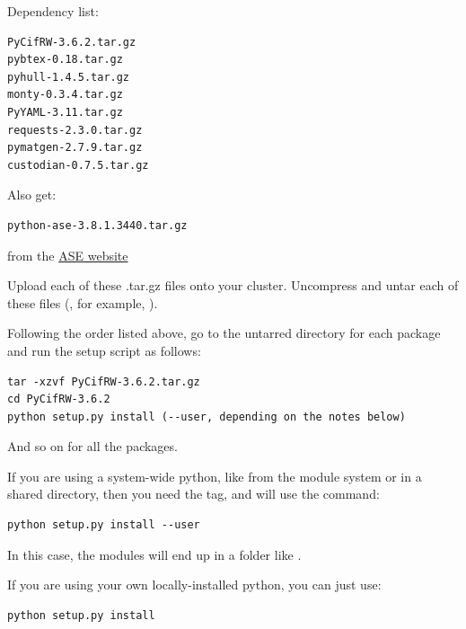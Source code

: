 \documentclass[letterpaper,10pt,english]{sphinxmanual}
\begin{document}
Dependency list:

\begin{Verbatim}[commandchars=\\\{\}]
PyCifRW-3.6.2.tar.gz
pybtex-0.18.tar.gz
pyhull-1.4.5.tar.gz
monty-0.3.4.tar.gz
PyYAML-3.11.tar.gz
requests-2.3.0.tar.gz
pymatgen-2.7.9.tar.gz
custodian-0.7.5.tar.gz
\end{Verbatim}

Also get:

\begin{Verbatim}[commandchars=\\\{\}]
python-ase-3.8.1.3440.tar.gz
\end{Verbatim}

from the \href{https://wiki.fysik.dtu.dk/ase/download.html}{ASE website}

Upload each of these .tar.gz files onto your cluster.
Uncompress and untar each of these files (, for example, ).

Following the order listed above, go to the untarred directory for each package and run the setup script as follows:

\begin{Verbatim}[commandchars=\\\{\}]
tar -xzvf PyCifRW-3.6.2.tar.gz
cd PyCifRW-3.6.2
python setup.py install (--user, depending on the notes below)
\end{Verbatim}

And so on for all the packages.

If you are using a system-wide python, like from the module system or in a shared directory, then you need the  tag, and will use the command:

\begin{Verbatim}[commandchars=\\\{\}]
python setup.py install --user
\end{Verbatim}

In this case, the modules will end up in a folder like .

If you are using your own locally-installed python, you can just use:

\begin{Verbatim}[commandchars=\\\{\}]
python setup.py install
\end{Verbatim}
\end{document}
